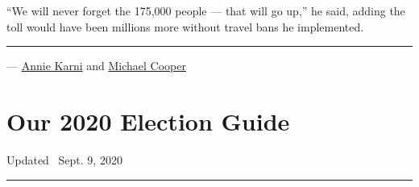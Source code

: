 ``We will never forget the 175,000 people --- that will go up,'' he
said, adding the toll would have been millions more without travel bans
he implemented.

\begin{center}\rule{0.5\linewidth}{\linethickness}\end{center}

--- \href{https://www.nytimes3xbfgragh.onion/by/annie-karni}{Annie
Karni} and
\href{https://www.nytimes3xbfgragh.onion/by/michael-cooper}{Michael
Cooper}

\hypertarget{our-2020-election-guide}{%
\section{Our 2020 Election Guide}\label{our-2020-election-guide}}

Updated ~Sept. 9, 2020

\begin{center}\rule{0.5\linewidth}{\linethickness}\end{center}


